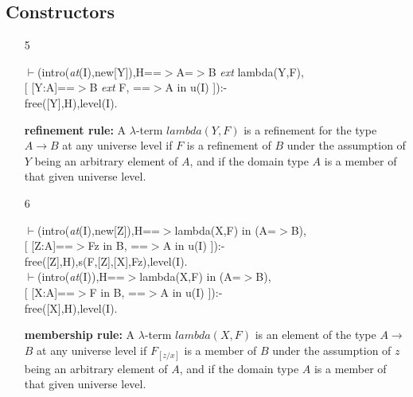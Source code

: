 \documentclass[11pt]{report}
\begin{document}
 \subsection{Constructors}
  
 \begin{enumerate}
 \item[5]
\begin{sf}\begin{tabbing}
$\vdash$(intro(\mbox{\it at}(I),new[Y]),H==$>$A=$>$B \mbox{\it ext} lambda(Y,F), \\[-0.15ex]
\hspace{2em}[ [Y:A]==$>$B \mbox{\it ext} F, ==$>$A in u(I) ]):-\\[-0.15ex]
\hspace{2em}free([Y],H),level(I).
\end{tabbing}\end{sf}

 {\bf refinement rule:}
 A $\lambda$-term $lambda(Y,F)$ is a refinement for the type 
 $A\rightarrow B$ at any universe level 
 if $F$ is a refinement of $B$ under the 
 assumption of $Y$ being an arbitrary element of $A$,
 and if the domain type $A$ is a member of that given 
 universe level.
  
 \item[6]
\begin{sf}\begin{tabbing}
$\vdash$(intro(\mbox{\it at}(I),new[Z]),H==$>$lambda(X,F) in (A=$>$B), \\[-0.15ex]
\hspace{2em}[ [Z:A]==$>$Fz in B, ==$>$A in u(I) ]):-\\[-0.15ex]
\hspace{2em}free([Z],H),s(F,[Z],[X],Fz),level(I).\\[-0.15ex]
$\vdash$(intro(\mbox{\it at}(I)),H==$>$lambda(X,F) in (A=$>$B),\\[-0.15ex]
\hspace{2em}[ [X:A]==$>$F in B, ==$>$A in u(I) ]):-\\[-0.15ex]
\hspace{2em}free([X],H),level(I).
\end{tabbing}\end{sf}

 {\bf membership rule:}
 A $\lambda$-term $lambda(X,F)$ is an element of the type 
 $A$$\rightarrow$$B$ at any universe level 
 if $F_{[z/x]}$ is a member of $B$ under the 
 assumption of $z$ being an arbitrary element of $A$,
 and if the domain type $A$ is a member of that given 
 universe level.


\end{enumerate}
\end{document}
